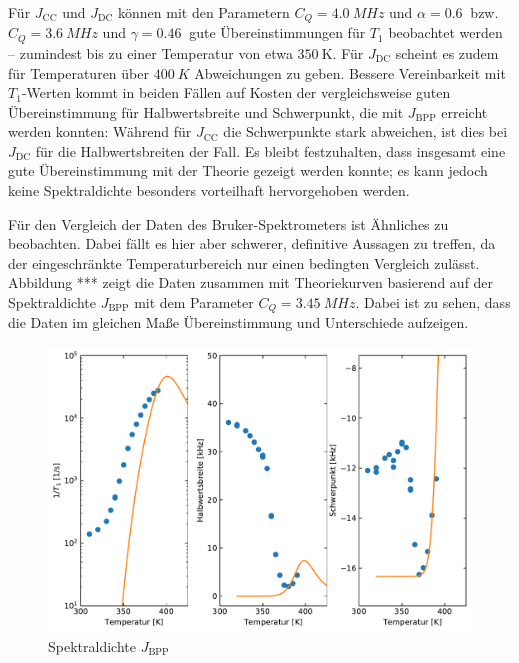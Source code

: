 Für $J_\text{CC}$ und $J_\text{DC}$ können mit den Parametern $C_Q = \SI{4.0}{MHz}$ und $\alpha = \SI{0.6}{}$ bzw. $C_Q = \SI{3.6}{MHz}$ und $\gamma = \SI{0.46}{}$ gute Übereinstimmungen für $T_1$ beobachtet werden -- zumindest bis zu einer Temperatur von etwa $\SI{350}{\kelvin}$. Für $J_\text{DC}$ scheint es zudem für Temperaturen über $\SI{400}{K}$ Abweichungen zu geben. Bessere Vereinbarkeit mit $T_1$-Werten kommt in beiden Fällen auf Kosten der vergleichsweise guten Übereinstimmung für Halbwertsbreite und Schwerpunkt, die mit $J_\text{BPP}$ erreicht werden konnten: Während für $J_\text{CC}$ die Schwerpunkte stark abweichen, ist dies bei $J_\text{DC}$ für die Halbwertsbreiten der Fall. Es bleibt festzuhalten, dass insgesamt eine gute Übereinstimmung mit der Theorie gezeigt werden konnte; es kann jedoch keine Spektraldichte besonders vorteilhaft hervorgehoben werden.

Für den Vergleich der Daten des Bruker-Spektrometers ist Ähnliches zu beobachten. Dabei fällt es hier aber schwerer, definitive Aussagen zu treffen, da der eingeschränkte Temperaturbereich nur einen bedingten Vergleich zulässt. Abbildung *** zeigt die Daten zusammen mit Theoriekurven basierend auf der Spektraldichte $J_\text{BPP}$ mit dem Parameter $C_Q = \SI{3.45}{MHz}$. Dabei ist zu sehen, dass die Daten im gleichen Maße Übereinstimmung und Unterschiede aufzeigen.
\begin{figure}
	\begin{center}
		\includegraphics[width=\textwidth]{graphics/plot/Bruker_J_01.pdf}
	\end{center}
	\caption{Spektraldichte $J_\text{BPP}$} \label{fig:res:theorie_bruker}
\end{figure}




